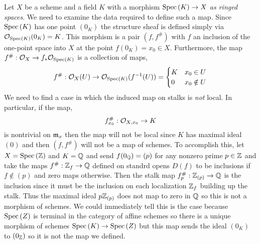 \documentclass[12pt]{article}
\begin{document}
Let $X$ be a scheme and a field $K$ with a morphism $\mathrm{Spec}\left( K \right) \to X$ \textit{as ringed spaces}. We need to examine the data required to define such a map. Since $\mathrm{Spec}\left( K \right)$ has one point $(0_K)$ the structure sheaf is defined simply via $\mathcal{O}_{\mathrm{Spec}\left( K \right)}(0_K) = K$. This morphism is a pair $(f, f^\#)$ with $f$ an inclusion of the one-point space into $X$ at  the point $f(0_K) = x_0 \in X$. Furthermore, the map $f^\# : \mathcal{O}_{X} \to f_* \mathcal{O}_{\mathrm{Spec}\left( K \right)}$ is a collection of maps, 
\[ f^{\#} : \mathcal{O}_{X}(U) \to \mathcal{O}_{\mathrm{Spec}\left( K \right)}(f^{-1}(U)) =  
\begin{cases}
K & x_0 \in U
\\
0 & x_0 \notin U
\end{cases} \]
We need to find a case in which the induced map on stalks is \textit{not} local. In particular, if the map,
\[ f^\#_{x_0} : \mathcal{O}_{X, x_0} \to K \]
is nontrivial on $\mathfrak{m}_x$ then the map will not be local since $K$ has maximal ideal $(0)$ and then $(f, f^\#)$ will not be a map of schemes. To accomplish this, let $X = \mathrm{Spec}\left( \mathbb{Z} \right)$ and $K = \mathbb{Q}$ and send $f(0_{\mathbb{Q}}) = (p)$ for any nonzero prime $p \in \mathbb{Z}$ and take the maps $f^{\#} : \mathbb{Z}_f \to \mathbb{Q}$ defined on standrd opens $D(f)$ to be inclusions if $f \notin (p)$ and zero maps otherwise. Then the stalk map $f^{\#}_p : \mathbb{Z}_{(p)} \to \mathbb{Q}$ is the inclusion since it must be the inclusion on each localization $\mathbb{Z}_f$ building up the stalk. Thus the maximal ideal $p \mathbb{Z}_{(p)}$ does not map to zero in $\mathbb{Q}$ so this is not a morphism of schemes. We could immediately tell this is the case because $\mathrm{Spec}\left( Z \right)$ is terminal in the category of affine schemes so there is a unique morphism of schemes $\mathrm{Spec}\left( K \right) \to \mathrm{Spec}\left( Z \right)$ but this map sends the ideal $(0_K)$ to $(0_{\mathbb{Z}})$ so it is not the map we defined.  
\end{document}

